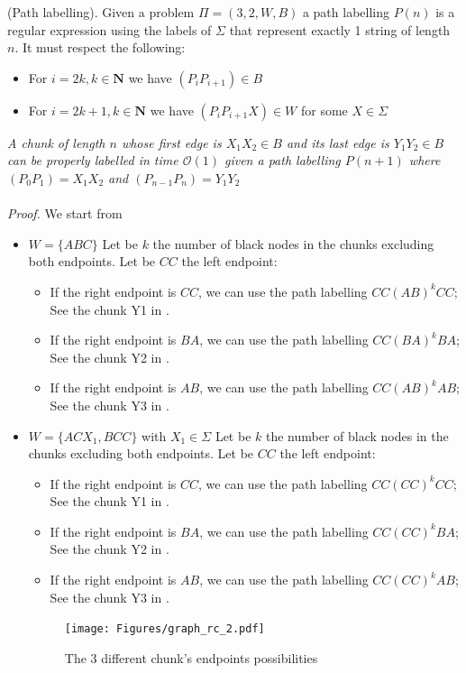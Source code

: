 \begin{defi}
(Path labelling). Given a problem $\Pi=(3,2,W,B)$ a path labelling $P(n)$ is a regular expression using the labels of $\Sigma$ that represent exactly 1 string of length $n$. It must respect the following:
\begin{itemize}
    \item For $i=2k, k\in\mathbf{N}$ we have $(P_iP_{i+1})\in B$
    \item For $i=2k+1, k\in\mathbf{N}$ we have $(P_iP_{i+1}X)\in W$ for some $X\in \Sigma$
\end{itemize}
\end{defi}

\begin{claim}
\textit{A chunk of length $n$ whose first edge is $X_1X_2\in B$ and its last edge is $Y_1Y_2\in B$ can be properly labelled in time $\mathcal{O}(1)$ given a path labelling $P(n+1)$ where $(P_0P_1)=X_1X_2$ and $(P_{n-1}P_n)=Y_1Y_2$}\\\\
\textit{Proof.} We start from
\end{claim}

\begin{itemize}
    \item $W=\{ABC\}$
    Let be $k$ the number of black nodes in the chunks excluding both endpoints.
    Let be $CC$ the left endpoint:
    \begin{itemize}
        \item If the right endpoint is $CC$, we can use the path labelling $CC(AB)^kCC$; See the chunk Y1 in .
        \item If the right endpoint is $BA$, we can use the path labelling $CC(BA)^kBA$; See the chunk Y2 in .
        \item If the right endpoint is $AB$, we can use the path labelling $CC(AB)^kAB$; See the chunk Y3 in .
    \end{itemize}
    \item $W=\{ACX_1,BCC\}$ with $X_1\in \Sigma$
    Let be $k$ the number of black nodes in the chunks excluding both endpoints.
    Let be $CC$ the left endpoint:
    \begin{itemize}
        \item If the right endpoint is $CC$, we can use the path labelling $CC(CC)^kCC$; See the chunk Y1 in .
        \item If the right endpoint is $BA$, we can use the path labelling $CC(CC)^kBA$; See the chunk Y2 in .
        \item If the right endpoint is $AB$, we can use the path labelling $CC(CC)^kAB$; See the chunk Y3 in .
    \end{itemize}
    \begin{figure}[htb]
    \centering
    \texttt{[image: Figures/graph\_rc\_2.pdf]}
    \caption{The 3 different chunk's endpoints possibilities}
    \label{fig:global_1}
\end{figure}
\end{itemize}

